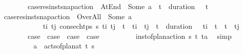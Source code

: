 \begin{isabellebody}
\ \ \ \ \ \ \isamarkupfalse%
\ {\isacharquery}{\kern0pt}case{}{\isacharequal}{\kern0pt}{\isachardoublequoteopen}res{\isacharunderscore}{\kern0pt}inst{\isacharunderscore}{\kern0pt}snap{\isacharunderscore}{\kern0pt}action\ {\isasympi}\ At{\isacharunderscore}{\kern0pt}End\ {\isacharequal}{\kern0pt}\ Some\ a\ {\isasymand}\ t\isactrlsub {\isasympi}\ {\isacharplus}{\kern0pt}\ duration\ {\isasympi}\ {\isacharequal}{\kern0pt}\ t{\isachardoublequoteclose}\isanewline
\ \ \ \ \ \ \isamarkupfalse%
\ {\isacharquery}{\kern0pt}case{}{\isacharequal}{\kern0pt}{\isachardoublequoteopen}res{\isacharunderscore}{\kern0pt}inst{\isacharunderscore}{\kern0pt}snap{\isacharunderscore}{\kern0pt}action\ {\isasympi}\ Over{\isacharunderscore}{\kern0pt}All\ {\isacharequal}{\kern0pt}\ Some\ a\ {\isasymand}\ \isanewline
\ \ \ \ \ \ \ \ \ \ \ \ {\isacharparenleft}{\kern0pt}{\isasymexists}t\isactrlsub i\ t\isactrlsub j{\isachardot}{\kern0pt}\ consec{\isacharunderscore}{\kern0pt}htps\ {\isasympi}s\ t\isactrlsub i\ t\isactrlsub j\ {\isasymand}\ t\isactrlsub {\isasympi}\ {\isasymle}\ t\isactrlsub i\ {\isasymand}\ t\isactrlsub j\ {\isasymle}\ t\isactrlsub {\isasympi}\ {\isacharplus}{\kern0pt}\ {\isacharparenleft}{\kern0pt}duration\ {\isasympi}{\isacharparenright}{\kern0pt}\ {\isasymand}\ t\isactrlsub i\ {\isacharless}{\kern0pt}\ t\ {\isasymand}\ t\ {\isacharless}{\kern0pt}\ t\isactrlsub j{\isacharparenright}{\kern0pt}{\isachardoublequoteclose}\isanewline
\ \ \ \ \ \ \isamarkupfalse%
\ {\isachardoublequoteopen}{\isacharquery}{\kern0pt}case{}\ {\isasymor}\ {\isacharquery}{\kern0pt}case{}\ {\isasymor}\ {\isacharquery}{\kern0pt}case{}\ {\isasymor}\ {\isacharquery}{\kern0pt}case{}{\isachardoublequoteclose}\isanewline
\ \ \ \ \ \ \ \ \isamarkupfalse%
\ {\isacartoucheopen}inst{\isacharunderscore}{\kern0pt}of{\isacharunderscore}{\kern0pt}plan{\isacharunderscore}{\kern0pt}action\ {\isasympi}s\ {\isacharparenleft}{\kern0pt}t\isactrlsub {\isasympi}{\isacharcomma}{\kern0pt}{\isasympi}{\isacharparenright}{\kern0pt}\ {\isacharparenleft}{\kern0pt}t{\isacharcomma}{\kern0pt}a{\isacharparenright}{\kern0pt}{\isacartoucheclose}\ \isamarkupfalse%
\ simp\isanewline
\ \ \ \ \ \ \isamarkupfalse%
\ \isamarkupfalse%
\ {\isachardoublequoteopen}a\ {\isasymin}\ acts{\isacharunderscore}{\kern0pt}of{\isacharunderscore}{\kern0pt}plan{\isacharunderscore}{\kern0pt}at\ t\ {\isasympi}s{\isachardoublequoteclose}\isanewline

\end{isabellebody}
